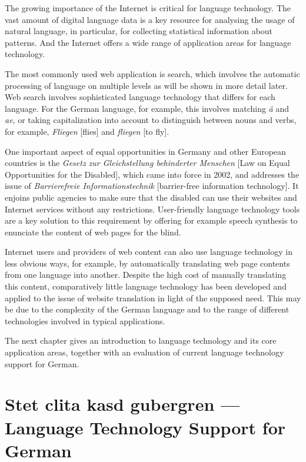 \documentclass[]{../metanetpaper}
\begin{document}
\begin{Parallel}[c]{80mm}{80mm}
{    The growing importance of the Internet is critical for language technology. The vast amount of digital language data is a key resource for analysing the usage of natural language, in particular, for collecting statistical information about patterns. And the Internet offers a wide range of application areas for language technology. 

    The most commonly used web application is search, which involves the automatic processing of language on multiple levels as will be shown in more detail later. Web search involves sophisticated language technology that differs for each language. For the German language, for example, this involves matching \textit{ä} and \textit{ae}, or taking capitalization into account to distinguish between nouns and verbs, for example, \textit{Fliegen} {[}flies{]} and \textit{fliegen} {[}to fly{]}.

    One important aspect of equal opportunities in Germany and other European countries is the \textit{Gesetz zur Gleichstellung behinderter Menschen} {[}Law on Equal Opportunities for the Disabled{]}, which came into force in 2002, and addresses the issue of \textit{Barrierefreie Informationstechnik} {[}barrier-free information technology{]}. It enjoins public agencies to make sure that the disabled can use their websites and Internet services without any restrictions. User-friendly language technology tools are a key solution to this requirement by offering for example speech synthesis to enunciate the content of web pages for the blind.

    Internet users and providers of web content can also use language technology in less obvious ways, for example, by automatically translating web page contents from one language into another. Despite the high cost of manually translating this content, comparatively little language technology has been developed and applied to the issue of website translation in light of the supposed need. This may be due to the complexity of the German language and to the range of different technologies involved in typical applications. 

    The next chapter gives an introduction to language technology and its core application areas, together with an evaluation of current language technology support for German.
  }
  
  \ParallelPar

  \clearpage


  \section{Stet clita kasd gubergren --- Language Technology Support for German}


\end{Parallel}
\end{document}
